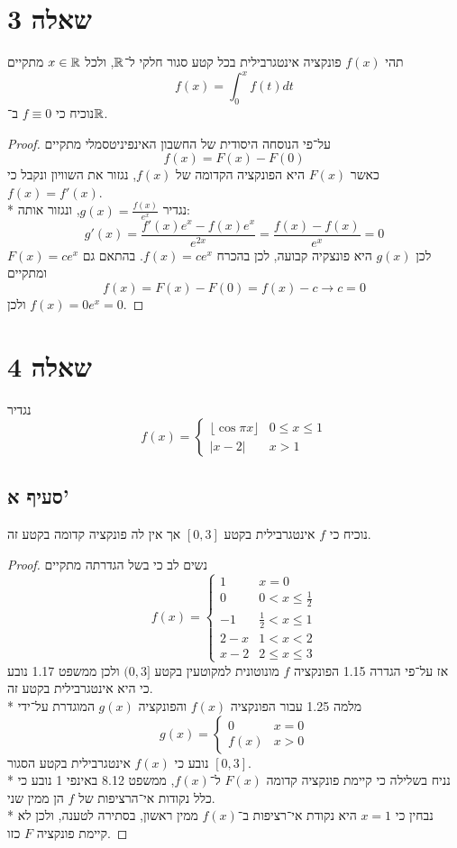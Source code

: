 \section{שאלה 3}
תהי $f(x)$ פונקציה אינטגרבילית בכל קטע סגור חלקי ל־$\mathbb{R}$, ולכל $x \in \mathbb{R}$ מתקיים
\[
	f(x) = \int_0^x f(t) dt
\]
נוכיח כי $f \equiv 0$ ב־$\mathbb{R}$.
\begin{proof}
	על־פי הנוסחה היסודית של החשבון האינפיניטסמלי מתקיים
	\[
		f(x) = F(x) - F(0)
	\]
	כאשר $F(x)$ היא הפונקציה הקדומה של $f(x)$, נגזור את השוויון ונקבל כי $f(x) = f'(x)$. \\*
	נגדיר $g(x) = \frac{f(x)}{e^x}$, ונגזור אותה:
	\[
		g'(x) = \frac{f'(x) e^x - f(x) e^x}{e^{2x}} = \frac{f(x) - f(x)}{e^x} = 0
	\]
	לכן $g(x)$ היא פונצקיה קבועה, לכן בהכרח $f(x) = c e^x$. בהתאם גם $F(x) = c e^x$ ומתקיים
	\[
		f(x) = F(x) - F(0) = f(x) - c \rightarrow c = 0
	\]
	ולכן $f(x) = 0 e^x = 0$.
\end{proof}

\section{שאלה 4}
נגדיר
\[
	f(x) = \begin{cases}
		\lfloor \cos \pi x \rfloor & 0 \le x \le 1 \\
		\lvert x - 2 \rvert & x > 1
	\end{cases}
\]

\subsection{סעיף א'}
נוכיח כי $f$ אינטגרבילית בקטע $[0, 3]$ אך אין לה פונקציה קדומה בקטע זה.
\begin{proof}
	נשים לב כי בשל הגדרתה מתקיים
	\[
		f(x) = \begin{cases}
			1 & x = 0 \\
			0 & 0 < x \le \frac{1}{2} \\
			-1 & \frac{1}{2} < x \le 1 \\
			2 - x & 1 < x < 2 \\
			x - 2 & 2 \le x \le 3
		\end{cases}
	\]
	אז על־פי הגדרה 1.15 הפונקציה $f$ מונוטונית למקוטעין בקטע $(0, 3]$ ולכן ממשפט 1.17 נובע כי היא אינטגרבילית בקטע זה. \\* %
	מלמה 1.25 עבור הפונקציה $f(x)$ והפונקציה $g(x)$ המוגדרת על־ידי
	\[
		g(x) = \begin{cases}
			0 & x = 0 \\
			f(x) & x > 0
		\end{cases}
	\]
	נובע כי $f(x)$ אינטגרבילית בקטע הסגור $[0, 3]$. \\*
	נניח בשלילה כי קיימת פונקציה קדומה $F(x)$ ל־$f(x)$, ממשפט 8.12 באינפי 1 נובע כי כלל נקודות אי־הרציפות של $f$ הן ממין שני. \\*
	נבחין כי $x = 1$ היא נקודת אי־רציפות ב־$f(x)$ ממין ראשון, בסתירה לטענה, ולכן לא קיימת פונקציה $F$ כזו.
\end{proof}


